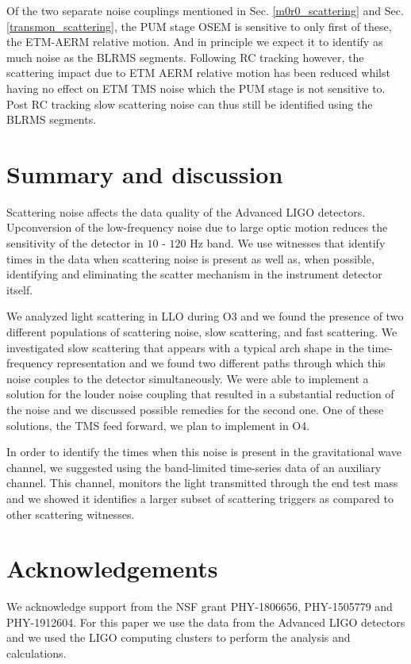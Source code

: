 \documentclass[12pt]{iopart}
\begin{document}
Of the two separate noise couplings mentioned in Sec. \ref{m0r0_scattering}  and Sec. \ref{transmon_scattering}, the PUM stage OSEM is sensitive to only first of these, the ETM-AERM relative motion. And in principle we expect it to identify as much noise as the BLRMS segments. Following RC tracking however, the scattering impact due to ETM AERM relative motion has been reduced whilst having no effect on ETM TMS noise which the PUM stage is not sensitive to. Post RC tracking slow scattering noise can thus still be identified using the BLRMS segments.



\newpage
\section{Summary and discussion}\label{summary}
 Scattering noise affects the data quality of the Advanced LIGO detectors. Upconversion of the low-frequency noise due to large optic motion reduces the sensitivity of the detector in $10$ - $120$ Hz band. We use witnesses that identify times in the data when scattering noise is present as well as, when possible, identifying and eliminating the scatter mechanism in the instrument detector itself. 

We analyzed light scattering in LLO during O3 and we found the presence of two different populations of scattering noise, slow scattering, and fast scattering. We investigated slow scattering that appears with a typical arch shape in the time-frequency representation and we found two different paths through which this noise couples to the detector simultaneously. We were able to implement a solution for the louder noise coupling that resulted in a substantial reduction of the noise and we discussed possible remedies for the second one. One of these solutions, the TMS feed forward, we plan to implement in O4.

In order to identify the times when this noise is present in the gravitational wave channel, we suggested using the band-limited time-series data of an auxiliary channel. This channel, monitors the light transmitted through the end test mass and we showed it identifies a larger subset of scattering triggers as compared to other scattering witnesses.
\par

\section{Acknowledgements} We acknowledge support from the NSF grant PHY-1806656, PHY-1505779 and  PHY-1912604. For this paper we use the data from the Advanced LIGO detectors and we used the LIGO computing clusters to perform the analysis and calculations. 
\end{document}
